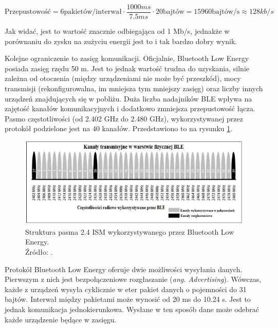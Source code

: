 \begin{equation}
	\text{Przepustowość} = 6 \text{pakietów/interwał} \cdot \frac{1000ms}{7.5ms} \cdot 20 \text{bajtów} = 15960 \text{bajtów/s} \approx 128 kb/s
\end{equation}

Jak widać, jest to wartość znacznie odbiegająca od 1 Mb/s, jednakże w porównaniu do zysku na zużyciu energii jest to i tak bardzo dobry wynik. 

Kolejne ograniczenie to zasięg komunikacji. Oficjalnie, Bluetooth Low Energy posiada zasięg rzędu 50 m. Jest to jednak wartość trudna do uzyskania, silnie zależna od otoczenia (między urządzeniami nie może być przeszkód), mocy transmisji (rekonfigurowalna, im mniejsza tym mniejszy zasięg) oraz liczby innych urządzeń znajdujących się w pobliżu. Duża liczba nadajników BLE wpływa na zajętość kanałów komunikacyjnych i dodatkowo zmniejsza przepustowość łącza. Pasmo częstotliwości (od 2.402 GHz do 2.480 GHz), wykorzystywanej przez protokół podzielone jest na 40 kanałów. Przedstawiono to na rysunku \ref{fig:image_ble_channels}.

\begin{figure}[H]
	\centering
	\includegraphics[width=17cm]{img/theory/BLE/ble_channels.png}
	\caption{Struktura pasma 2.4 ISM wykorzystywanego przez Bluetooth Low Energy.\\Źródło: \cite{inzynierka}.}
	\label{fig:image_ble_channels}
\end{figure}

Protokół Bluetooth Low Energy oferuje dwie możliwości wysyłania danych. Pierwszym z nich jest bezpołączeniowe rozgłaszanie (\textit{ang. Advertising}). Wówczas, każde z urządzeń wysyła cyklicznie  w eter pakiet danych o pojemności do 31 bajtów. Interwał między pakietami może wynosić od 20 ms do 10.24 s. Jest to jednak komunikacja jednokierunkowa. Wysłane w ten sposób dane może odebrać każde urządzenie będące w zasięgu.

